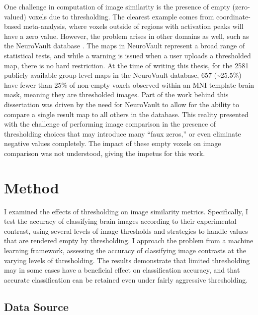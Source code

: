 \documentclass{report}
\begin{document}
One challenge in computation of image similarity is the presence of
empty (zero-valued) voxels due to thresholding. The clearest example
comes from coordinate-based meta-analysis, where voxels outside of
regions with activation peaks will have a zero value. However, the
problem arises in other domains as well, such as the NeuroVault database \cite{Gorgolewski2015-sf}.
The maps in NeuroVault represent a broad range of statistical tests, and
while a warning is issued when a user uploads a thresholded map, there
is no hard restriction. At the time of writing this thesis, for the 2581
publicly available group-level maps in the NeuroVault database, 657
(\textasciitilde{}25.5\%) have fewer than 25\% of non-empty voxels
observed within an MNI template brain mask, meaning they are thresholded
images. Part of the work behind this dissertation was driven by the need
for NeuroVault to allow for the ability to compare a single result map
to all others in the database. This reality presented with the challenge
of performing image comparison in the presence of thresholding choices
that may introduce many ``faux zeros,'' or even eliminate negative
values completely. The impact of these empty voxels on image comparison
was not understood, giving the impetus for this work.

\section{Method}

I examined the effects of thresholding on image similarity metrics.
Specifically, I test the accuracy of classifying brain images according
to their experimental contrast, using several levels of image thresholds
and strategies to handle values that are rendered empty by thresholding.
I approach the problem from a machine learning framework, assessing the
accuracy of classifying image contrasts at the varying levels of
thresholding. The results demonstrate that limited thresholding may in
some cases have a beneficial effect on classification accuracy, and that
accurate classification can be retained even under fairly aggressive
thresholding.

\subsection{Data Source}
\end{document}
